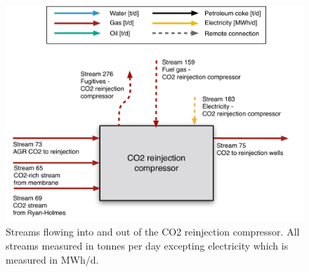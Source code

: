 \documentclass[11pt]{report}
\begin{document}
\begin{figure}
\includegraphics[width=0.85\columnwidth]{images/CO2_reinjection_compressor_PF.pdf}
\caption{Streams flowing into and out of the CO2 reinjection compressor. All streams measured in tonnes per day excepting electricity which is measured in MWh/d.}
\label{fig:CO2_reinjection_compressor_PF}
\end{figure}
\end{document}
